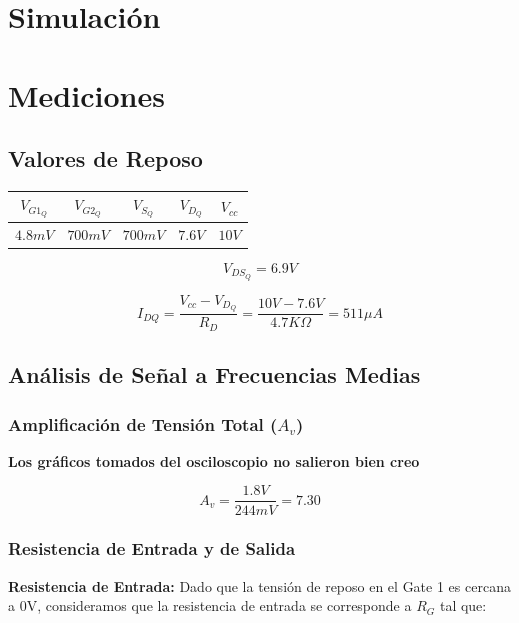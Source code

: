 \documentclass[a4paper, 10pt, spanish]{article}
\begin{document}
\section{Simulación}

\section{Mediciones}

\subsection{Valores de Reposo}

\begin{center}
  \begin{tabular}{|c|c|c|c|c|}
    \hline
    $V_{G1_Q}$ & $V_{G2_Q}$ & $V_{S_Q}$ & $V_{D_Q}$ & $V_{cc}$ \\
    \hline
    $4.8mV$ & $700mV$ & $700mV$ & $7.6V$ & $10V$ \\
    \hline
  \end{tabular}
  \label{tab:valores_reposo_med}
\end{center}

\begin{equation}
  V_{DS_Q} = 6.9V
\end{equation}

\begin{equation}
  I_{DQ} = \frac{V_{cc} - V_{D_Q}}{R_D} = \frac{10V - 7.6V}{4.7K\Omega} = 511 \mu A
\end{equation}

\subsection{Análisis de Señal a Frecuencias Medias}

\subsubsection{Amplificación de Tensión Total ($A_v$)}

\textbf{Los gráficos tomados del osciloscopio no salieron bien creo}

\begin{equation}
  A_v=\frac{1.8V}{244mV}=7.30
\end{equation}

\subsubsection{Resistencia de Entrada y de Salida}
\textbf{Resistencia de Entrada:}
Dado que la tensión de reposo en el Gate 1 es cercana a 0V, consideramos que la resistencia de entrada se corresponde a $R_G$ tal que:
\end{document}
